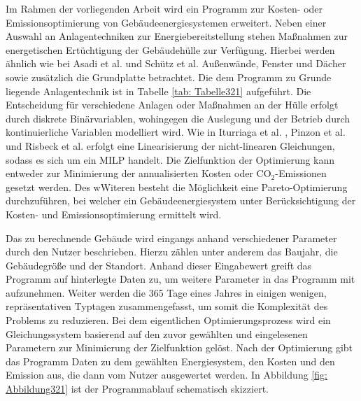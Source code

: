 Im Rahmen der vorliegenden Arbeit wird ein Programm zur Kosten- oder Emissionsoptimierung von Gebäudeenergiesystemen erweitert.
Neben einer Auswahl an Anlagentechniken zur Energiebereitstellung stehen Maßnahmen zur energetischen Ertüchtigung der Gebäudehülle zur Verfügung. 
Hierbei werden ähnlich wie bei Asadi et al. \cite{Asadi.2012} und Schütz et al. \cite{Schutz.2017} Außenwände, Fenster und Dächer sowie zusätzlich die Grundplatte betrachtet.
Die dem Programm zu Grunde liegende Anlagentechnik ist in Tabelle \ref{tab: Tabelle321} aufgeführt.
Die Entscheidung für verschiedene Anlagen oder Maßnahmen an der Hülle erfolgt durch diskrete Binärvariablen, wohingegen die Auslegung und der Betrieb durch kontinuierliche Variablen modelliert wird.
Wie in Iturriaga et al. \cite{Iturriaga.2017}, Pinzon et al. \cite{Pinzon.23.04.201726.04.2017} und Risbeck et al. \cite{Risbeck.2017} erfolgt eine Linearisierung der nicht-linearen Gleichungen, sodass es sich um ein MILP handelt.
Die Zielfunktion der Optimierung kann entweder zur Minimierung der annualisierten Kosten oder CO\(_2\)-Emissionen gesetzt werden.
Des wWiteren besteht die Möglichkeit eine Pareto-Optimierung durchzuführen, bei welcher ein Gebäudeenergiesystem unter Berücksichtigung der Kosten- und Emissionsoptimierung ermittelt wird.

Das zu berechnende Gebäude wird eingangs anhand verschiedener Parameter durch den Nutzer beschrieben.
Hierzu zählen unter anderem das Baujahr, die Gebäudegröße und der Standort.
Anhand dieser Eingabewert greift das Programm auf hinterlegte Daten zu, um weitere Parameter in das Programm mit aufzunehmen.
Weiter werden die 365 Tage eines Jahres in einigen wenigen, repräsentativen Typtagen zusammengefasst, um somit die Komplexität des Problems zu reduzieren.
Bei dem eigentlichen Optimierungsprozess wird ein Gleichungssystem basierend auf den zuvor gewählten und eingelesenen Parametern zur Minimierung der Zielfunktion gelöst.
Nach der Optimierung gibt das Programm Daten zu dem gewählten Energiesystem, den Kosten und den Emission aus, die dann vom Nutzer ausgewertet werden.
In Abbildung \ref{fig: Abbildung321} ist der Programmablauf schematisch skizziert.

